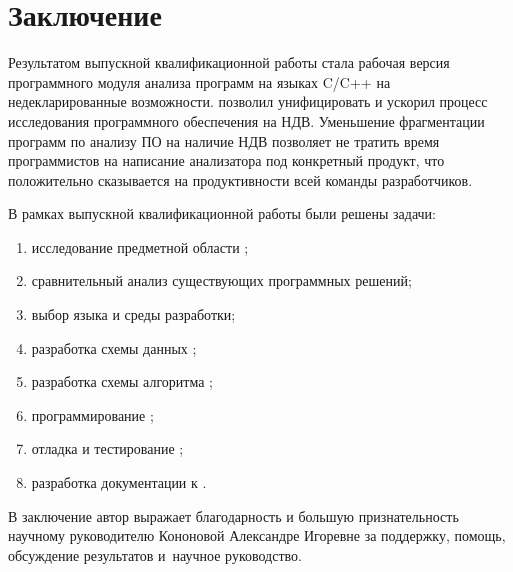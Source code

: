 \chapter*{Заключение}                       %


Результатом выпускной квалификационной работы стала рабочая версия
программного модуля анализа программ на языках C/C++ на недекларированные
возможности. {\ProgModule} позволил унифицировать и ускорил процесс исследования
программного обеспечения на НДВ.
Уменьшение фрагментации программ по анализу ПО на наличие НДВ позволяет
не тратить время программистов на написание анализатора под конкретный продукт,
что положительно сказывается на продуктивности всей команды разработчиков.

В рамках выпускной квалификационной работы были решены задачи:
\begin{enumerate}[label={\arabic*)}]
    \item исследование предметной области ;
    \item сравнительный анализ существующих программных решений;
    \item выбор языка и среды разработки;
    \item разработка схемы данных {\ProgModule};
    \item разработка схемы алгоритма {\ProgModule};
    \item программирование {\ProgModule};
    \item отладка и тестирование {\ProgModule};
    \item разработка документации к {\ProgModule}.
\end{enumerate}
 
В заключение автор
выражает благодарность и большую признательность научному руководителю
Кононовой Александре Игоревне за поддержку, помощь, обсуждение результатов и~научное
руководство.
